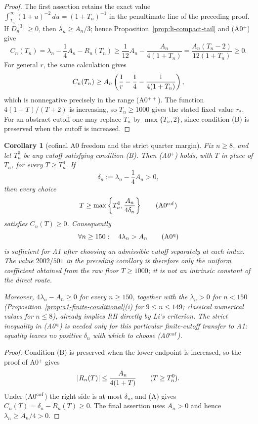 \documentclass[11pt]{amsart}
\newtheorem{corollary}[theorem]{Corollary}
\theoremstyle{definition}
\theoremstyle{remark}
\theoremstyle{definition}
\begin{document}
\begin{proof}
The first assertion retains the exact value
$\int_{T_n}^{\infty}(1+u)^{-2}\,du=(1+T_n)^{-1}$ in the penultimate line of
the preceding proof.  If $D_n^{[3]}\ge0$, then $\lambda_n\ge A_n/3$; hence
Proposition~\ref{prop:li-compact-tail} and (A0$^+$) give
\[
 C_n(T_n)
 =\lambda_n-\frac14A_n-R_n(T_n)
 \ge \frac1{12}A_n-\frac{A_n}{4(1+T_n)}
 =\frac{A_n(T_n-2)}{12(1+T_n)}\ge0.
\]
For general $r$, the same calculation gives
\[
 C_n(T_n)\ge A_n\left({1\over r}-{1\over4}
                    -{1\over4(1+T_n)}\right),
\]
which is nonnegative precisely in the range (A0$^{++}$).  The function
$4(1+T)/(T+2)$ is increasing, so $T_n\ge1000$ gives the stated fixed value
$r_*$.
For an abstract cutoff one may replace $T_n$ by $\max\{T_n,2\}$, since
condition (B) is preserved when the cutoff is increased.
\end{proof}

\begin{corollary}[cofinal A0 freedom and the strict quarter margin]
\label{cor:a0-cofinal-quarter-margin}
Fix $n\ge8$, and let $T_n^0$ be any cutoff satisfying condition \emph{(B)}.
Then (A0$^+$) holds, with $T$ in place of $T_n$, for every $T\ge T_n^0$.
If
\[
 \delta_n:=\lambda_n-\frac14A_n>0,
\]
then every choice
\[
 T\ge\max\left\{T_n^0,{A_n\over4\delta_n}\right\}          \tag{A0$^{\rm cof}$}
\]
satisfies $C_n(T)\ge0$.  Consequently
\[
 \forall n\ge150:\quad4\lambda_n>A_n                       \tag{A0$^{\rm q}$}
\]
is sufficient for A1 after choosing an admissible cutoff separately at each
index.  The value $2002/501$ in the preceding corollary is therefore only
the uniform coefficient obtained from the raw floor $T\ge1000$; it is not
an intrinsic constant of the direct route.

Moreover, $4\lambda_n-A_n\ge0$ for every $n\ge150$, together with the
$\lambda_n>0$ for $n<150$ (Proposition~\ref{prop:a1-finite-conditional}(i) for $9\le n\le149$;
classical numerical values for $n\le8$), already implies RH directly by Li's criterion.
The strict inequality in (A0$^{\rm q}$) is needed only for this particular
finite-cutoff transfer to A1: equality leaves no positive $\delta_n$ with
which to choose (A0$^{\rm cof}$).
\end{corollary}

\begin{proof}
Condition (B) is preserved when the lower endpoint is increased, so the
proof of A0$^+$ gives
\[
 |R_n(T)|\le {A_n\over4(1+T)}\qquad(T\ge T_n^0).
\]
Under (A0$^{\rm cof}$) the right side is at most $\delta_n$, and (A) gives
$C_n(T)=\delta_n-R_n(T)\ge0$.  The final assertion uses $A_n>0$ and hence
$\lambda_n\ge A_n/4>0$.
\end{proof}
\end{document}
